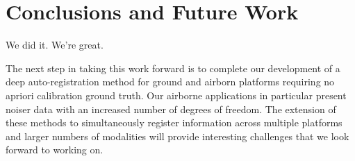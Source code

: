 \documentclass{article}
\begin{document}


\section{Conclusions and Future Work} %
\label{sec:conclusions_and_future_work}
We did it. We're great.

The next step in taking this work forward is to complete our development of a deep auto-registration method for ground and airborn platforms requiring no apriori calibration ground truth.  Our airborne applications in particular present noiser data with an increased number of degrees of freedom. The extension of these methods to simultaneously register information across multiple platforms and larger numbers of modalities will provide interesting challenges that we look forward to working on. 






\end{document}
